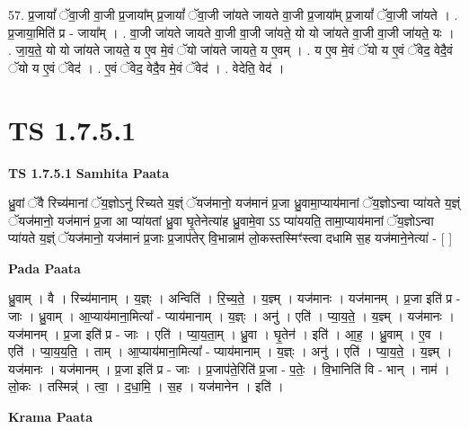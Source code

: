 \documentclass[17pt]{extarticle}
\begin{document}
57. प्र॒जायां᳚ ॅवा॒जी वा॒जी प्र॒जाया᳚म् प्र॒जायां᳚ ॅवा॒जी जा॑यते जायते वा॒जी प्र॒जाया᳚म् प्र॒जायां᳚ ॅवा॒जी जा॑यते । . प्र॒जाया॒मिति॑ प्र - जाया᳚म् । . वा॒जी जा॑यते जायते वा॒जी वा॒जी जा॑यते॒ यो यो जा॑यते वा॒जी वा॒जी जा॑यते॒ यः । . जा॒य॒ते॒ यो यो जा॑यते जायते॒ य ए॒व मे॒वं ॅयो जा॑यते जायते॒ य ए॒वम् । . य ए॒व मे॒वं ॅयो य ए॒वं ॅवेद॒ वेदै॒वं ॅयो य ए॒वं ॅवेद॑ । . ए॒वं ॅवेद॒ वेदै॒व मे॒वं ॅवेद॑ । . वेदेति॒ वेद॑ । \newline
\pagebreak
{}

\section{ TS 1.7.5.1 }

\textbf{TS 1.7.5.1 } \newline
\textbf{Samhita Paata} \newline

ध्रु॒वां ॅवै रिच्य॑मानां ॅय॒ज्ञोऽनु॑ रिच्यते य॒ज्ञ्ं ॅयज॑मानो॒ यज॑मानं प्र॒जा ध्रु॒वामा॒प्याय॑मानां ॅय॒ज्ञोऽन्वा प्या॑यते य॒ज्ञ्ं ॅयज॑मानो॒ यज॑मानं प्र॒जा आ प्या॑यतां ध्रु॒वा घृ॒तेनेत्या॑ह ध्रु॒वामे॒वा ऽऽ प्या॑ययति॒ तामा॒प्याय॑मानां ॅय॒ज्ञोऽन्वा प्या॑यते य॒ज्ञ्ं ॅयज॑मानो॒ यज॑मानं प्र॒जाः प्र॒जाप॑तेर् वि॒भान्नाम॑ लो॒कस्तस्मिꣳ॑स्त्वा दधामि स॒ह यज॑माने॒नेत्या॑ - [ ] \newline

\textbf{Pada Paata} \newline

ध्रु॒वाम् । वै । रिच्य॑मानाम् । य॒ज्ञ्ः । अन्विति॑ । रि॒च्य॒ते॒ । य॒ज्ञ्म् । यज॑मानः । यज॑मानम् । प्र॒जा इति॑ प्र - जाः । ध्रु॒वाम् । आ॒प्याय॑माना॒मित्या᳚ - प्याय॑मानाम् । य॒ज्ञ्ः । अनु॑ । एति॑ । प्या॒य॒ते॒ । य॒ज्ञ्म् । यज॑मानः । यज॑मानम् । प्र॒जा इति॑ प्र - जाः । एति॑ । प्या॒य॒ता॒म् । ध्रु॒वा । घृ॒तेन॑ । इति॑ । आ॒ह॒ । ध्रु॒वाम् । ए॒व । एति॑ । प्या॒य॒य॒ति॒ । ताम् । आ॒प्याय॑माना॒मित्या᳚ - प्याय॑मानाम् । य॒ज्ञ्ः । अनु॑ । एति॑ । प्या॒य॒ते॒ । य॒ज्ञ्म् । यज॑मानः । यज॑मानम् । प्र॒जा इति॑ प्र - जाः । प्र॒जाप॑ते॒रिति॑ प्र॒जा - प॒तेः॒ । वि॒भानिति॑ वि - भान् । नाम॑ । लो॒कः । तस्मिन्न्॑ । त्वा॒ । द॒धा॒मि॒ । स॒ह । यज॑मानेन । इति॑ ।  \newline


\textbf{Krama Paata} \newline
\end{document}
